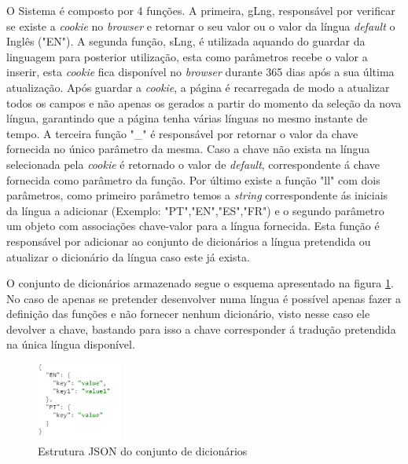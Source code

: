 \par O Sistema é composto por 4 funções. A primeira, gLng, responsável por verificar se existe a \textit{cookie} no \textit{browser} e retornar o seu valor ou o valor da língua \textit{default} o Inglês ("EN"). A segunda função, sLng, é utilizada aquando do guardar da linguagem para posterior utilização, esta como parâmetros recebe o valor a inserir, esta \textit{cookie} fica disponível no \textit{browser} durante 365 dias após a sua última atualização. Após guardar a \textit{cookie}, a página é recarregada de modo a atualizar todos os campos e não apenas os gerados a partir do momento da seleção da nova língua, garantindo que a página tenha várias línguas no mesmo instante de tempo. A terceira função "\_" é responsável por retornar o valor da chave fornecida no único parâmetro da mesma. Caso a chave não exista na língua selecionada pela \textit{cookie} é retornado o valor de \textit{default}, correspondente á chave fornecida como parâmetro da função. Por último existe a função "ll" com dois parâmetros, como primeiro parâmetro temos a \textit{string} correspondente ás iniciais da língua a adicionar (Exemplo: "PT","EN","ES","FR") e o segundo parâmetro um objeto com associações chave-valor para a língua fornecida. Esta função é responsável por adicionar ao conjunto de dicionários a língua pretendida ou atualizar o dicionário da língua caso este já exista.
\par O conjunto de dicionários armazenado segue o esquema apresentado na figura \ref{dicextr}. No caso de apenas se pretender desenvolver numa língua é possível apenas fazer a definição das funções e não fornecer nenhum dicionário, visto nesse caso ele devolver a chave, bastando para isso a chave corresponder á tradução pretendida na única língua disponível.



\begin{figure}[ht]
\centering
\includegraphics[width=0.25\textwidth]{images/extrjson.png}
\caption{Estrutura JSON do conjunto de dicionários}\label{dicextr}
\end{figure}

